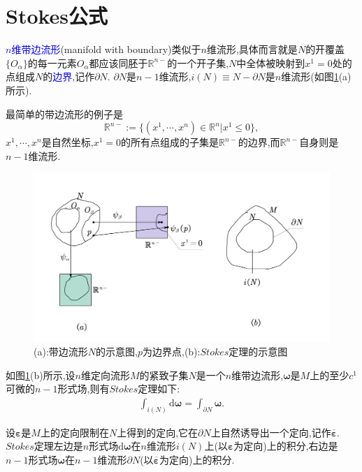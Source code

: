 \section{Stokes公式}

\textcolor{blue}{$n$维带边流形}(manifold with boundary)类似于$n$维流形,具体而言就是$N$的开覆盖$\{O_\alpha\}$的每一元素$O_\alpha$都应该同胚于$\mathbb{R}^{n-}$的一个开子集,$N$中全体被映射到$x^1=0$处的点组成$N$的\textcolor{blue}{边界},记作$\partial N$. $\partial N$是$n-1$维流形,$i(N)\equiv N-\partial N$是$n$维流形(如图\ref{fig:5-3}(a)所示).
\begin{remark}
    最简单的带边流形的例子是$$\mathbb{R}^{n-}:=\{(x^1,\cdots,x^n)\in \mathbb{R}^n|x^1\leqslant 0\},$$
    $x^1,\cdots,x^n$是自然坐标,$x^1=0$的所有点组成的子集是$\mathbb{R}^{n-}$的边界,而$\mathbb{R}^{n-}$自身则是$n-1$维流形.
\end{remark}
\begin{figure}[htbp]
    \centering
 \includegraphics[width=\textwidth]{img/5-3.png}
    \caption{(a):带边流形$N$的示意图,$p$为边界点,(b):$Stokes$定理的示意图}
    \label{fig:5-3}
\end{figure}
如图\ref{fig:5-3}(b)所示,设$n$维定向流形$M$的紧致子集$N$是一个$n$维带边流形,$\boldsymbol{\omega}$是$M$上的至少$c^1$可微的$n-1$形式场,则有$Stokes$定理如下:
\begin{align}
\boxed{\int_{i(N)}\mathrm{d}\boldsymbol{\omega}=\int_{\partial N}\boldsymbol{\omega}.}
\end{align}
\begin{remark}
    设$\boldsymbol{\varepsilon}$是$M$上的定向限制在$N$上得到的定向,它在$\partial N$上自然诱导出一个定向,记作$\overline{\boldsymbol{\varepsilon}}$.
    $Stokes$定理左边是$n$形式场$\mathrm{d}\boldsymbol{\omega}$在$n$维流形$i(N)$上(以$\boldsymbol{\varepsilon}$为定向)上的积分,右边是$n-1$形式场$\boldsymbol{\omega}$在$n-1$维流形$\partial N$(以$\overline{\boldsymbol{\varepsilon}}$为定向)上的积分.
\end{remark}
